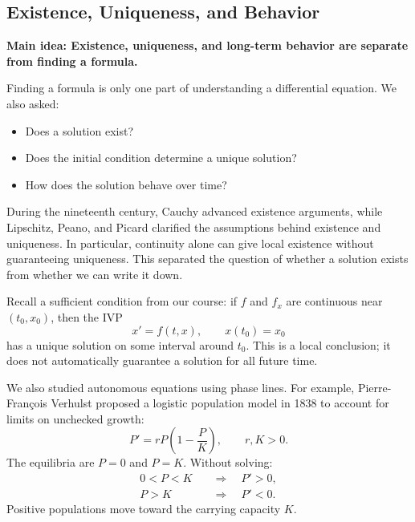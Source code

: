 \documentclass[11pt,letterpaper]{article}
\begin{document}

\subsection{Existence, Uniqueness, and Behavior}

\textbf{Main idea: Existence, uniqueness, and long-term behavior are separate from finding a formula.}

Finding a formula is only one part of understanding
a differential equation. We also asked:
\begin{itemize}
    \item Does a solution exist?
    \item Does the initial condition determine a
    unique solution?
    \item How does the solution behave over time?
\end{itemize}

During the nineteenth century, Cauchy advanced
existence arguments, while Lipschitz, Peano, and
Picard clarified the assumptions behind existence
and uniqueness. In particular, continuity alone can
give local existence without guaranteeing uniqueness.
This separated the question of whether a solution exists
from whether we can write it down.


Recall a sufficient condition from our course:
if $f$ and $f_x$ are continuous near $(t_0,x_0)$,
then the IVP
\[
x'=f(t,x),\qquad x(t_0)=x_0
\]
has a unique solution on some interval around $t_0$.
This is a local conclusion; it does not automatically
guarantee a solution for all future time.

We also studied autonomous equations using phase lines.
For example, Pierre-Fran\c{c}ois Verhulst proposed a
logistic population model in 1838 to account for
limits on unchecked growth:
\[
P'=rP\left(1-\frac{P}{K}\right),
\qquad r,K>0.
\]
The equilibria are $P=0$ and $P=K$. Without solving:
\[
\begin{aligned}
0<P<K &\quad\Longrightarrow\quad P'>0,\\
P>K   &\quad\Longrightarrow\quad P'<0.
\end{aligned}
\]
Positive populations move toward the carrying
capacity $K$.
\end{document}
